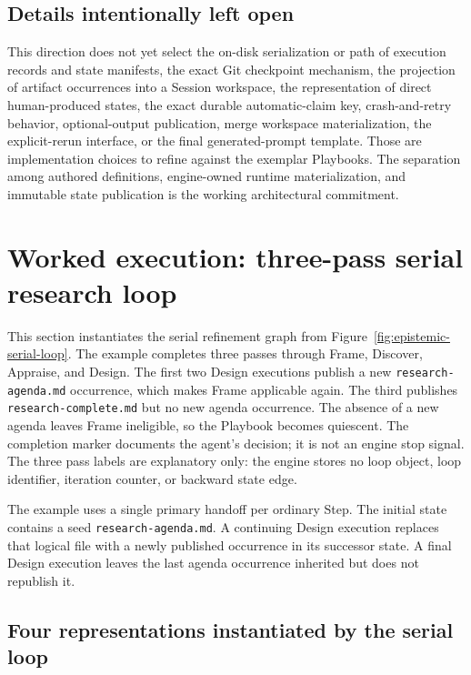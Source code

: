 \documentclass[11pt]{article}
\newcommand{\artifact}[1]{\texttt{#1}}
\begin{document}
\subsection{Details intentionally left open}

This direction does not yet select the on-disk serialization or path of
execution records and state manifests, the exact Git checkpoint mechanism, the
projection of artifact occurrences into a Session workspace, the representation
of direct human-produced states, the exact durable automatic-claim key,
crash-and-retry behavior, optional-output publication, merge workspace
materialization, the explicit-rerun interface, or the final generated-prompt
template. Those are implementation choices to refine against the exemplar Playbooks. The
separation among authored definitions, engine-owned runtime materialization,
and immutable state publication is the working architectural commitment.

\clearpage
\section{Worked execution: three-pass serial research loop}

\begin{summarybox}
This section instantiates the serial refinement graph from
Figure~\ref{fig:epistemic-serial-loop}. The example completes three passes
through Frame, Discover, Appraise, and Design. The first two Design executions
publish a new \artifact{research-agenda.md} occurrence, which makes Frame
applicable again. The third publishes \artifact{research-complete.md} but no new
agenda occurrence. The absence of a new agenda leaves Frame ineligible, so the
Playbook becomes quiescent. The completion marker documents the agent's
decision; it is not an engine stop signal. The three pass labels are
explanatory only: the engine stores no loop object, loop identifier, iteration
counter, or backward state edge.
\end{summarybox}

The example uses a single primary handoff per ordinary Step. The initial state
contains a seed \artifact{research-agenda.md}. A continuing Design execution
replaces that logical file with a newly published occurrence in its successor
state. A final Design execution leaves the last agenda occurrence inherited
but does not republish it.

\subsection{Four representations instantiated by the serial loop}
\end{document}

